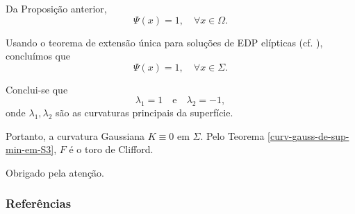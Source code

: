 \documentclass[12pt,a4paper]{beamer}
\theoremstyle{definition}
\begin{document}
\begin{frame}[allowframebreaks]
	Da Proposição anterior,
	\[ \Psi(x) = 1, \quad \forall x \in \Omega. \]
	
	Usando o teorema de extensão única para soluções de EDP elípticas (cf. \cite{Aronszajn1957}), concluímos que
	\[ \Psi(x) = 1, \quad \forall x \in \Sigma. \]
	
	Conclui-se que
	\[ \lambda_1 = 1 \quad \text{e} \quad \lambda_2 = -1, \]
	onde $\lambda_1,\lambda_2$ são as curvaturas principais da superfície.

	Portanto, a curvatura Gaussiana $K \equiv 0$ em $\Sigma$. Pelo Teorema \ref{curv-gauss-de-sup-min-em-S3}, $F$ é o toro de Clifford.
\end{frame}

\begin{frame}
	\begin{center}
		\huge Obrigado pela atenção.
	\end{center}
\end{frame}

\begin{frame}[allowframebreaks]
	\frametitle{Referências}
	
\end{frame}
\end{document}
